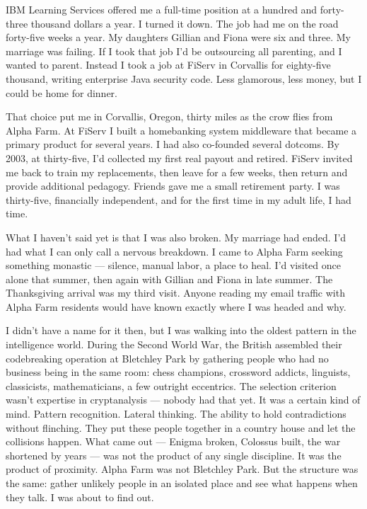 IBM Learning Services offered me a full-time position at a hundred and forty-three thousand dollars a year. I turned it down. The job had me on the road forty-five weeks a year. My daughters Gillian and Fiona were six and three. My marriage was failing. If I took that job I'd be outsourcing all parenting, and I wanted to parent. Instead I took a job at FiServ in Corvallis for eighty-five thousand, writing enterprise Java security code. Less glamorous, less money, but I could be home for dinner.

That choice put me in Corvallis, Oregon, thirty miles as the crow flies from Alpha Farm. At FiServ I built a homebanking system middleware that became a primary product for several years. I had also co-founded several dotcoms. By 2003, at thirty-five, I'd collected my first real payout and retired. FiServ invited me back to train my replacements, then leave for a few weeks, then return and provide additional pedagogy. Friends gave me a small retirement party. I was thirty-five, financially independent, and for the first time in my adult life, I had time.

What I haven't said yet is that I was also broken. My marriage had ended. I'd had what I can only call a nervous breakdown. I came to Alpha Farm seeking something monastic --- silence, manual labor, a place to heal. I'd visited once alone that summer, then again with Gillian and Fiona in late summer. The Thanksgiving arrival was my third visit. Anyone reading my email traffic with Alpha Farm residents would have known exactly where I was headed and why.

I didn't have a name for it then, but I was walking into the oldest pattern in the intelligence world. During the Second World War, the British assembled their codebreaking operation at Bletchley Park by gathering people who had no business being in the same room: chess champions, crossword addicts, linguists, classicists, mathematicians, a few outright eccentrics. The selection criterion wasn't expertise in cryptanalysis --- nobody had that yet. It was a certain kind of mind. Pattern recognition. Lateral thinking. The ability to hold contradictions without flinching. They put these people together in a country house and let the collisions happen. What came out --- Enigma broken, Colossus built, the war shortened by years --- was not the product of any single discipline. It was the product of proximity. Alpha Farm was not Bletchley Park. But the structure was the same: gather unlikely people in an isolated place and see what happens when they talk. I was about to find out.

